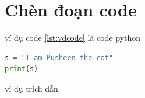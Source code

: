 \section{Chèn đoạn code}


ví dụ code \ref{lst:vdcode} là code python 


\begin{lstlisting}[caption={Đoạn code}, label={lst:vdcode}, language=python]
s = "I am Pusheen the cat"
print(s)
\end{lstlisting}

ví dụ trích dẫn \cite{robinson2013graph}














